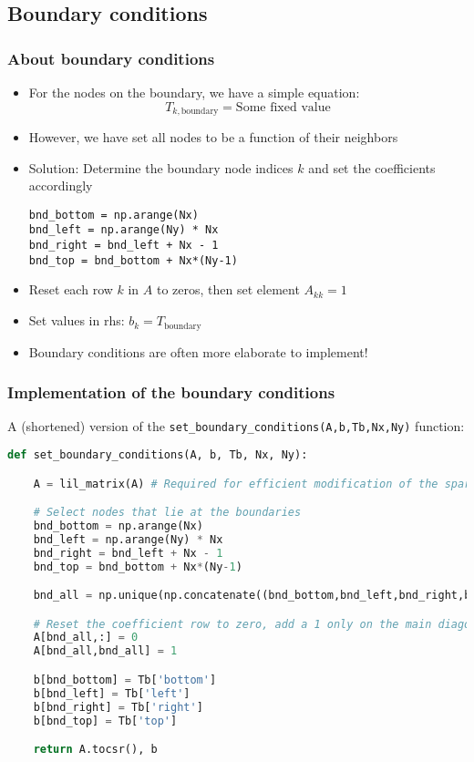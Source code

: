 \subsection*{Boundary conditions}
\begin{frame}[fragile]
  \frametitle{About boundary conditions}
  \begin{itemize}
    \item For the nodes on the boundary, we have a simple equation:
    \[
      T_{k,\text{boundary}} = \text{Some fixed value}
      \]
      \item However, we have set all nodes to be a function of their neighbors 
      \item Solution: Determine the boundary node indices $k$ and set the coefficients accordingly
      \begin{lstlisting}
bnd_bottom = np.arange(Nx)
bnd_left = np.arange(Ny) * Nx
bnd_right = bnd_left + Nx - 1
bnd_top = bnd_bottom + Nx*(Ny-1)
      \end{lstlisting}
      \item Reset each row $k$ in $A$ to zeros, then set element $A_{kk} = 1$
      \item Set values in rhs: $b_k = T_{\text{boundary}}$
      \item Boundary conditions are often more elaborate to implement!
  \end{itemize}
\end{frame}

{\nologo
\begin{frame}[fragile]
  \frametitle{Implementation of the boundary conditions}
  A (shortened) version of the \lstinline|set_boundary_conditions(A,b,Tb,Nx,Ny)| function:
  \begin{lstlisting}[language=Python]
def set_boundary_conditions(A, b, Tb, Nx, Ny):

    A = lil_matrix(A) # Required for efficient modification of the sparsity

    # Select nodes that lie at the boundaries
    bnd_bottom = np.arange(Nx)
    bnd_left = np.arange(Ny) * Nx
    bnd_right = bnd_left + Nx - 1
    bnd_top = bnd_bottom + Nx*(Ny-1)

    bnd_all = np.unique(np.concatenate((bnd_bottom,bnd_left,bnd_right,bnd_top)))

    # Reset the coefficient row to zero, add a 1 only on the main diagonal
    A[bnd_all,:] = 0
    A[bnd_all,bnd_all] = 1

    b[bnd_bottom] = Tb['bottom']
    b[bnd_left] = Tb['left']
    b[bnd_right] = Tb['right']
    b[bnd_top] = Tb['top']

    return A.tocsr(), b
  \end{lstlisting}
\end{frame}
}

